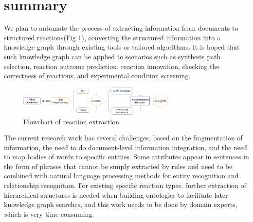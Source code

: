 \documentclass[%
 aip,
 jmp,%
 amsmath,amssymb,
 reprint,%
]{revtex4-2}
\begin{document}
\section{summary}
We plan to automate the process of extracting information from documents to structured reactions(Fig \ref{ Fig.7 }), 
converting the structured information into a knowledge graph through existing tools or tailored algorithms. It is hoped that such knowledge 
graph can be applied to scenarios such as synthesis path selection, reaction outcome prediction, reaction innovation, checking the correctness of reactions, and experimental condition screening.
\begin{figure}[htbp]
 \centering
 \includegraphics[width=0.7\textwidth]{figure/7.png}
 \caption{ Flowchart of reaction extraction }
 \label{ Fig.7 }
\end{figure}
The current research work has several challenges, based on the fragmentation of information, the need to do document-level information 
integration, and the need to map bodies of words to specific entities. Some attributes appear in sentences in the form of phrases that cannot 
be simply extracted by rules and need to be combined with natural language processing methods for entity recognition and relationship 
recognition. For existing specific reaction types, further extraction of hierarchical structures is needed when building ontologies to 
facilitate later knowledge graph searches, and this work needs to be done by domain experts, which is very time-consuming.
\end{document}
